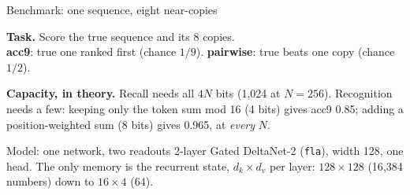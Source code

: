 \documentclass{article}
\renewcommand{\small}{\fontsize{25}{32}\selectfont}
\begin{document}
\begin{minipage}[t]{13.7in}
\begin{block}{Benchmark: one sequence, eight near-copies}
  \vspace{0.2in}\centering
  \par\raggedright\vspace{0.25in}
  \textbf{Task.} Score the true sequence and its 8 copies.\\
  \textbf{acc9}: true one ranked first (chance $1/9$).
  \textbf{pairwise}: true beats one copy (chance $1/2$).

  \vspace{0.15in}
  \textbf{Capacity, in theory.} Recall needs all $4N$ bits (1{,}024 at $N{=}256$).
  Recognition needs a few: keeping only the token sum mod 16 (4 bits) gives acc9 0.85;
  adding a position-weighted sum (8 bits) gives 0.965, at \emph{every} $N$.
\end{block}
\begin{block}{Model: one network, two readouts}
  2-layer Gated DeltaNet-2 (\texttt{fla}), width 128, one head.
  The only memory is the recurrent state, $d_k{\times}d_v$ per layer: $128{\times}128$ (16{,}384 numbers) down to $16{\times}4$ (64).


\end{block}
\end{minipage}
\end{document}

